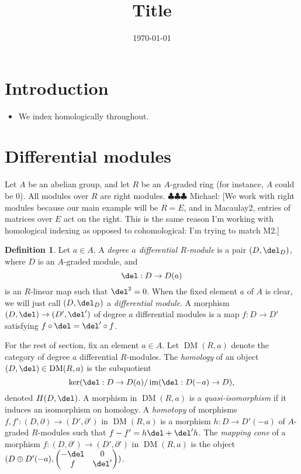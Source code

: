 \documentclass[12pt]{amsart}
\title{Title}
\date{\today}
\theoremstyle{definition}
\newtheorem{defn}[lemma]{Definition}
\theoremstyle{remark}
\newcommand{\im}{\operatorname{im}}
\newcommand{\michael}[1]{{\color{red} \sf $\clubsuit\clubsuit\clubsuit$ Michael: [#1]}}
\def\DM{\operatorname{DM}}
\begin{document}
\maketitle
\tableofcontents

\section{Introduction}




\begin{itemize}
\item We index homologically throughout. 
\end{itemize}

\section{Differential modules}

Let $A$ be an abelian group, and let $R$ be an $A$-graded ring (for instance, $A$ could be 0). All modules over $R$ are right modules. \michael{We work with right modules because our main example will be $R = E$, and in Macaulay2, entries of matrices over $E$ act on the right. This is the same reason I'm working with homological indexing as opposed to cohomological: I'm trying to match M2.} 

\begin{defn}
Let $a \in A$. A \emph{degree $a$ differential $R$-module} is a pair $(D, \del_D)$, where $D$ is an $A$-graded module, and
$$
\del: D \to D(a)
$$
is an $R$-linear map such that $\del^2 = 0$. When the fixed element $a$ of $A$ is clear, we will just call $(D, \del_D)$ a \emph{differential module}. A morphism $(D, \del) \to (D', \del')$ of degree $a$ differential modules is a map $f : D \to D'$ satisfying $f \circ \del = \del' \circ f$. 
\end{defn}

For the rest of section, fix an element $a \in A$. Let $\DM(R,a)$ denote the category of degree $a$ differential $R$-modules. The \emph{homology} of an object $(D, \del) \in \DM(R,a)$ is the subquotient
$$
\ker(\del : D \to D(a) / \im(\del : D(-a) \to D),
$$
denoted $H(D, \del)$. A morphism in $\DM(R, a)$ is a \emph{quasi-isomorphism} if it induces an isomorphism on homology. A \emph{homotopy} of morphisms $f, f' : (D, \partial) \to (D', \partial')$ in $\DM(R, a)$ is a morphism $h : D\to D'(-a)$ of $A$-graded $R$-modules such that $f - f' = h \del + \del' h$. The \emph{mapping cone} of a morphism $f : (D, \partial') \to (D', \partial')$ in $\DM(R, a)$ is the object $(D \oplus D'(-a), \begin{pmatrix} -\del & 0 \\ f & \del' \end{pmatrix})$.
\end{document}

